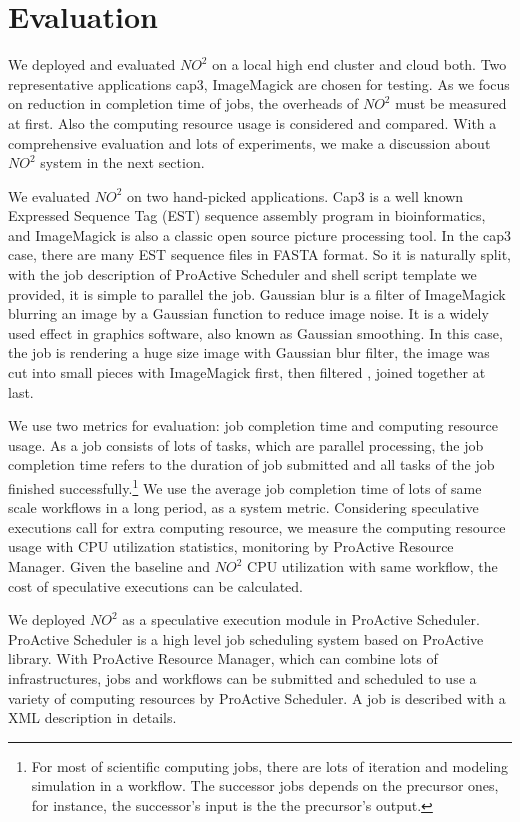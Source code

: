 \section{Evaluation}
We deployed and evaluated $NO^2$ on a local high end cluster and cloud both. Two representative applications cap3, ImageMagick are chosen for testing. As we focus on reduction in completion time of jobs, the overheads of $NO^2$ must be measured at first. Also the computing resource usage is considered and compared. With a comprehensive evaluation and lots of experiments, we make a discussion about $NO^2$ system in the next section.

We evaluated $NO^2$ on two hand-picked applications. Cap3 is a well known Expressed Sequence Tag (EST) sequence assembly program in bioinformatics, and ImageMagick is also a classic open source picture processing tool. In the cap3 case, there are many EST sequence files in FASTA format. So it is naturally split, with the job description of ProActive Scheduler and shell script template we provided, it is simple to parallel the job. Gaussian blur is a filter of ImageMagick blurring an image by a Gaussian function to reduce image noise. It is a widely used effect in graphics software, also known as Gaussian smoothing. In this case, the job is rendering a huge size image with Gaussian blur filter, the image was cut into small pieces with ImageMagick first, then filtered , joined together at last.

We use two metrics for evaluation: job completion time and computing resource usage. As a job consists of lots of tasks, which are parallel processing, the job completion time refers to the duration of job submitted and all tasks of the job finished successfully.\footnote{For most of scientific computing jobs, there are lots of iteration and modeling simulation in a workflow. The successor jobs depends on the precursor ones, for instance, the successor's input is the the precursor's output.} We use the average job completion time of lots of same scale workflows in a long period, as a system metric. Considering speculative executions call for extra computing resource, we measure the computing resource usage with CPU utilization statistics, monitoring by ProActive Resource Manager. Given the baseline and $NO^2$ CPU utilization with same workflow, the cost of speculative executions can be calculated.

We deployed $NO^2$ as a speculative execution module in ProActive Scheduler. ProActive Scheduler is a high level job scheduling system based on ProActive library. With ProActive Resource Manager, which can combine lots of infrastructures, jobs and workflows can be submitted and scheduled to use a variety of computing resources by ProActive Scheduler. A job is described with a XML description in details.

